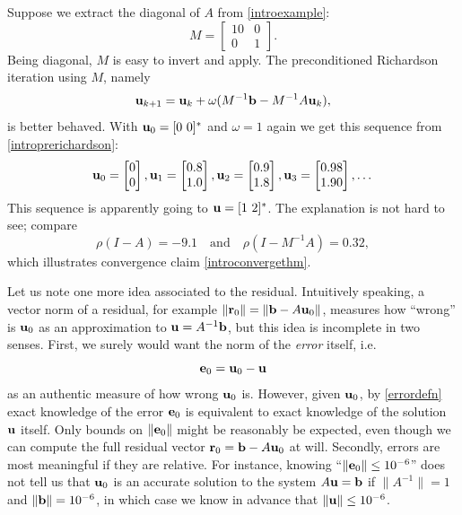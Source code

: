 \medskip\noindent\hrulefill
\begin{examplecont}  Suppose we extract the diagonal of $A$ from  \eqref{introexample}:
\begin{equation}
M = \begin{bmatrix}
10 & 0 \\ 0 & 1
\end{bmatrix}.  \label{introM}
\end{equation}
Being diagonal, $M$ is easy to invert and apply.  The preconditioned Richardson iteration using $M$, namely
\begin{equation}
\mathbf{u}_{k+1} = \mathbf{u}_k + \omega (M^{-1} \mathbf{b} - M^{-1} A \mathbf{u}_k),  \label{introprerichardson}
\end{equation}
is better behaved.  With $\mathbf{u}_0 = [0\,\, 0]^*$ and $\omega=1$ again we get this sequence from \eqref{introprerichardson}:
\begin{equation}
{\mathbf{u}}_{0} = \begin{bmatrix} 0 \\ 0 \end{bmatrix}, {\mathbf{u}}_{1} = \begin{bmatrix} 0.8 \\ 1.0 \end{bmatrix}, {\mathbf{u}}_{2} = \begin{bmatrix} 0.9 \\ 1.8 \end{bmatrix}, {\mathbf{u}}_{3} = \begin{bmatrix} 0.98 \\ 1.90 \end{bmatrix}, \dots
\end{equation}
This sequence is apparently going to $\mathbf{u} = [1\,\, 2]^*$.  The explanation is not hard to see; compare
\begin{equation}
\rho(I-A) = -9.1 \quad \text{and} \quad \rho(I-M^{-1} A) = 0.32,
\end{equation}
which illustrates convergence claim \eqref{introconvergethm}.
\end{examplecont}
\noindent\hrulefill

\medskip
Let us note one more idea associated to the residual.  Intuitively speaking, a vector norm of a residual, for example $\|\mathbf{r}_0\| = \|\mathbf{b} - A \mathbf{u}_0\|$, measures how ``wrong'' is $\mathbf{u}_0$ as an approximation to $\mathbf{u}=A^{-1}\mathbf{b}$, but this idea is incomplete in two senses.  First, we surely would want the norm of the \emph{error} itself, i.e.
\begin{equation}
\mathbf{e}_0 = \mathbf{u}_0 - \mathbf{u} \label{errordefn}
\end{equation}
as an authentic measure of how wrong $\mathbf{u}_0$ is.  However, given $\mathbf{u}_0$, by \eqref{errordefn} exact knowledge of the error $\mathbf{e}_0$ is equivalent to exact knowledge of the solution $\mathbf{u}$ itself.  Only bounds on $\|\mathbf{e}_0\|$ might be reasonably be expected, even though we can compute the full residual vector $\mathbf{r}_0 = \mathbf{b} - A \mathbf{u}_0$ at will.  Secondly, errors are most meaningful if they are relative.  For instance, knowing ``$\|\mathbf{e}_0\|\le 10^{-6}$'' does not tell us that $\mathbf{u}_0$ is an accurate solution to the system $A \mathbf{u} = \mathbf{b}$ if $\|A^{-1}\|=1$ and $\|\mathbf{b}\|= 10^{-6}$, in which case we know in advance that $\|\mathbf{u}\|\le 10^{-6}$.

